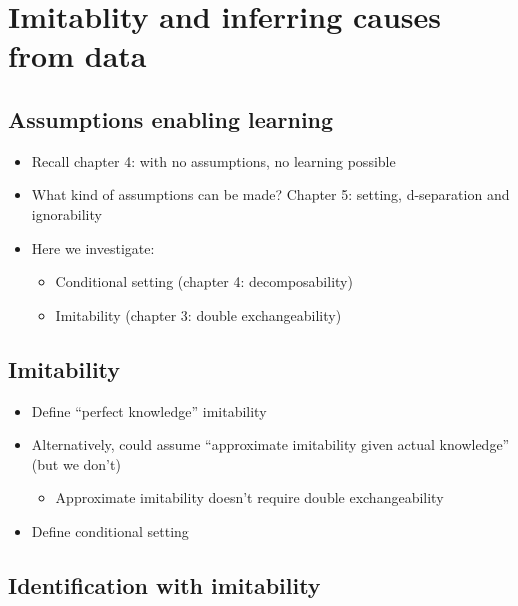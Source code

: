 

\chapter{Imitablity and inferring causes from data}\label{ch:inferring_causes}


\section{Assumptions enabling learning}

\begin{itemize}
    \item Recall chapter 4: with no assumptions, no learning possible
    \item What kind of assumptions can be made? Chapter 5: setting, d-separation and ignorability
    \item Here we investigate:
    \begin{itemize}
        \item Conditional setting (chapter 4: decomposability)
        \item Imitability (chapter 3: double exchangeability)
    \end{itemize}
\end{itemize}

\section{Imitability}

\begin{itemize}
    \item Define ``perfect knowledge'' imitability
    \item Alternatively, could assume ``approximate imitability given actual knowledge'' (but we don't)
    \begin{itemize}
        \item Approximate imitability doesn't require double exchangeability
    \end{itemize}
    \item Define conditional setting
\end{itemize}

\section{Identification with imitability}

